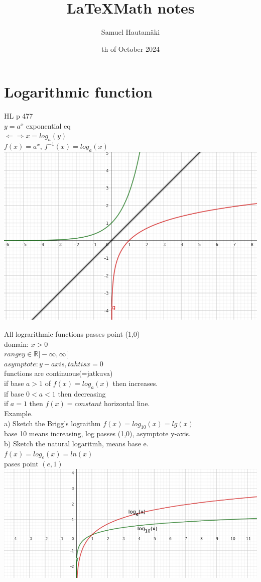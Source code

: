 \documentclass{article}
\title{\LaTeX Math notes}
\author{Samuel Hautamäki}
\date{th of October 2024}
\begin{document}
  \maketitle
   
  \section{Logarithmic function}
  HL p 477\\
  $y=a^x$ exponential eq\\
  $\Leftarrow\Rightarrow x=log_a(y)$\\
  $f(x)=a^x$, $f^{-1}(x)=log_a(x)$\\

  \includegraphics{log_exp_graph}

  All lograrithmic functions passes point (1,0)\\
  domain: $x>0$\\
  $range y\in\mathbb{R} ]-\infty,\infty[$\\
  $asymptote: y-axis, taht is x=0$\\
  functions are continuous(=jatkuva)\\
  if base $a>1$ of $f(x)=log_a(x)$ then increases.\\
  if base $0<a<1$ then decreasing\\
  if $a=1$ then $f(x)=constant$ horizontal line.\\
  Example.\\
  a) Sketch the Brigg's lograithm $f(x)=log_{10}(x)=lg(x)$\\
  base 10 means increasing, log passes (1,0), asymptote y-axis.\\
  b) Sketch the natural logaritmh, means base e.\\
  $f(x)=log_e(x)=ln(x)$\\
  pases point $(e,1)$\\
  \includegraphics{log10e}
\end{document}
